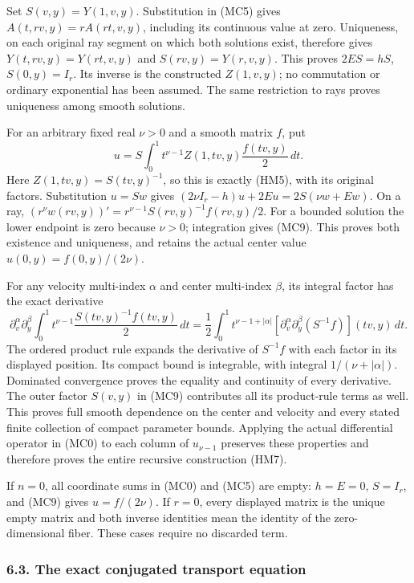 \documentclass[
  11pt,
]{article}
\begin{document}
Set \(S(v,y)=Y(1,v,y)\). Substitution in (MC5) gives
\(A(t,rv,y)=rA(rt,v,y)\), including its continuous value at zero.
Uniqueness, on each original ray segment on which both solutions exist,
therefore gives \(Y(t,rv,y)=Y(rt,v,y)\) and \(S(rv,y)=Y(r,v,y)\). This
proves \(2ES=hS\), \(S(0,y)=I_r\). Its inverse is the constructed
\(Z(1,v,y)\); no commutation or ordinary exponential has been assumed.
The same restriction to rays proves uniqueness among smooth solutions.

For an arbitrary fixed real \(\nu>0\) and a smooth matrix \(f\), put \[
 u=S\int_0^1 t^{\nu-1}Z(1,tv,y)\frac{f(tv,y)}2\,dt.
 \tag{MC9}
\] Here \(Z(1,tv,y)=S(tv,y)^{-1}\), so this is exactly (HM5), with its
original factors. Substitution \(u=Sw\) gives
\((2\nu I_r-h)u+2Eu=2S(\nu w+Ew)\). On a ray,
\((r^\nu w(rv,y))'=r^{\nu-1}S(rv,y)^{-1}f(rv,y)/2\). For a bounded
solution the lower endpoint is zero because \(\nu>0\); integration gives
(MC9). This proves both existence and uniqueness, and retains the actual
center value \(u(0,y)=f(0,y)/(2\nu)\).

For any velocity multi-index \(\alpha\) and center multi-index
\(\beta\), its integral factor has the exact derivative \[
 \partial_v^\alpha\partial_y^\beta
 \int_0^1 t^{\nu-1}\frac{S(tv,y)^{-1}f(tv,y)}2\,dt
 =\frac12\int_0^1 t^{\nu-1+|\alpha|}
       [\partial_v^\alpha\partial_y^\beta(S^{-1}f)](tv,y)\,dt.
 \tag{MC10}
\] The ordered product rule expands the derivative of \(S^{-1}f\) with
each factor in its displayed position. Its compact bound is integrable,
with integral \(1/(\nu+|\alpha|)\). Dominated convergence proves the
equality and continuity of every derivative. The outer factor \(S(v,y)\)
in (MC9) contributes all its product-rule terms as well. This proves
full smooth dependence on the center and velocity and every stated
finite collection of compact parameter bounds. Applying the actual
differential operator in (MC0) to each column of \(u_{\nu-1}\) preserves
these properties and therefore proves the entire recursive construction
(HM7).

If \(n=0\), all coordinate sums in (MC0) and (MC5) are empty: \(h=E=0\),
\(S=I_r\), and (MC9) gives \(u=f/(2\nu)\). If \(r=0\), every displayed
matrix is the unique empty matrix and both inverse identities mean the
identity of the zero-dimensional fiber. These cases require no discarded
term.

\subsubsection{6.3. The exact conjugated transport
equation}\label{the-exact-conjugated-transport-equation}
\end{document}
